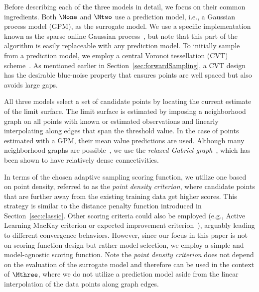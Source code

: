 Before describing each of the three models in detail, we focus on their common ingredients.
%
%
Both $\Mone$ and $\Mtwo$ use a prediction model, i.e., a Gaussian process model (GPM), as the surrogate model.
%
We use a specific implementation known as the sparse online Gaussian process~\cite{CsatoOpper2002}, but note that this part of the algorithm is easily replaceable with any prediction model.
%
To initially sample from a prediction model, we employ a central Voronoi tessellation (CVT)
scheme~\cite{DuFaberGunzburger1999}.
%
As mentioned earlier in Section~\ref{sec:forwardSampling}, a CVT design has the desirable blue-noise property that ensures points are well spaced but also avoids large gaps.

All three models select a set of candidate points by locating the current estimate of the limit surface.
%
The limit surface is estimated by imposing a neighborhood graph on all points with known or estimated observations and linearly interpolating along edges that span the threshold value.
%
In the case of points estimated with a GPM, their mean value predictions are used.
%
Although many neighborhood graphs are possible~\cite{CorreaLindstrom2011,MaljovecSahaLindstrom2013}, we use the \emph{relaxed Gabriel graph}~\cite{BoseCardinalCollette2009}, which has been shown to have relatively dense connectivities.

In terms of the chosen adaptive sampling scoring function, we utilize one based on point density, referred to as the \emph{point density criterion}, where candidate points that are further away from the existing training data get higher scores.
%
This strategy is similar to the distance penalty function introduced in Section~\ref{sec:classic}.
%
Other scoring criteria could also be employed (e.g., Active Learning MacKay criterion \cite{MacKay1992} or expected improvement criterion~\cite{Lam2008,JonesSchonlauWelch1998,Schonlau1997}), arguably leading to different convergence behaviors.
%
However, since our focus in this paper is not on scoring function design but rather model selection, we employ a simple and model-agnostic scoring function.
%
Note the \emph{point density criterion} does not depend on the evaluation of the surrogate model and therefore can be used in the context of $\Mthree$, where we do not utilize a prediction model aside from the linear interpolation of the data points along graph edges.

